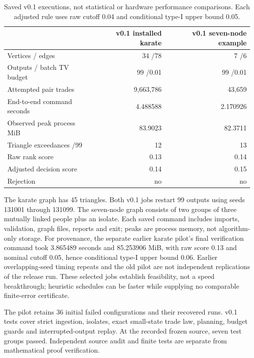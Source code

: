 \documentclass[11pt]{article}
\begin{document}
\begin{table}[ht]
\centering\small
\begin{tabular}{lrr}
\toprule
 & v0.1 installed karate & v0.1 seven-node example\\
\midrule
Vertices / edges &34 /78 &7 /6\\
Outputs / batch TV budget &99 /0.01 &99 /0.01\\
Attempted pair trades &9,663,786 &43,659\\
End-to-end command seconds &4.488588 &2.170926\\
Observed peak process MiB &83.9023 &82.3711\\
Triangle exceedances /99 &12 &13\\
Raw rank score &0.13 &0.14\\
Adjusted decision score &0.14 &0.15\\
Rejection &no &no\\
\bottomrule
\end{tabular}
\caption{Saved v0.1 executions, not statistical or hardware performance comparisons. Each adjusted rule uses raw cutoff 0.04 and conditional type-I upper bound 0.05.}\label{tab:runs}
\end{table}

The karate graph has 45 triangles. Both v0.1 jobs restart 99 outputs using seeds 131001 through 131099. The seven-node graph consists of two groups of three mutually linked people plus an isolate. Each saved command includes imports, validation, graph files, reports and exit; peaks are process memory, not algorithm-only storage. For provenance, the separate earlier karate pilot's final verification command took 3.865489 seconds and 85.253906 MiB, with raw score 0.13 and nominal cutoff 0.05, hence conditional type-I upper bound 0.06. Earlier overlapping-seed timing repeats and the old pilot are not independent replications of the release run. These selected jobs establish feasibility, not a speed breakthrough; heuristic schedules can be faster while supplying no comparable finite-error certificate.

The pilot retains 36 initial failed configurations and their recovered runs. v0.1 tests cover strict ingestion, isolates, exact small-state trade law, planning, budget guards and interrupted-output replay. At the recorded frozen source, seven test groups passed. Independent source audit and finite tests are separate from mathematical proof verification.
\end{document}
